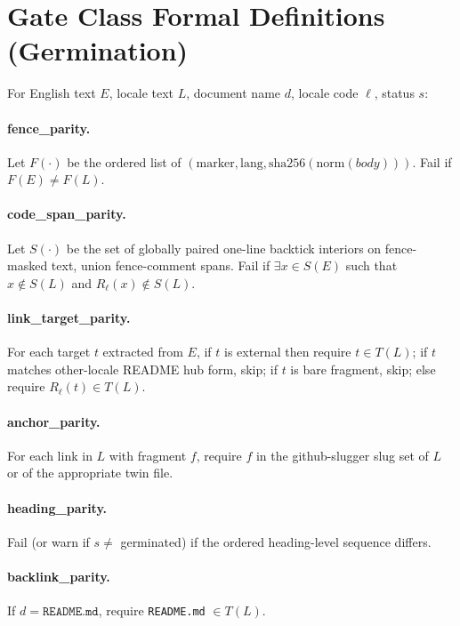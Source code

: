 \documentclass[11pt]{article}
\theoremstyle{definition}
\theoremstyle{plain}
\theoremstyle{remark}
\begin{document}
\section{Gate Class Formal Definitions (Germination)}
\label{app:gate}

For English text $E$, locale text $L$, document name $d$, locale code $\ell$,
status $s$:

\paragraph{fence\_parity.}
Let $F(\cdot)$ be the ordered list of
$(\mathrm{marker}, \mathrm{lang}, \mathrm{sha256}(\mathrm{norm}(body)))$.
Fail if $F(E) \neq F(L)$.

\paragraph{code\_span\_parity.}
Let $S(\cdot)$ be the set of globally paired one-line backtick interiors on
fence-masked text, union fence-comment spans. Fail if $\exists x \in S(E)$
such that $x \notin S(L)$ and $R_\ell(x) \notin S(L)$.

\paragraph{link\_target\_parity.}
For each target $t$ extracted from $E$, if $t$ is external then require $t
\in T(L)$; if $t$ matches other-locale README hub form, skip; if $t$ is bare
fragment, skip; else require $R_\ell(t) \in T(L)$.

\paragraph{anchor\_parity.}
For each link in $L$ with fragment $f$, require $f$ in the github-slugger
slug set of $L$ or of the appropriate twin file.

\paragraph{heading\_parity.}
Fail (or warn if $s\neq$ germinated) if the ordered heading-level sequence
differs.

\paragraph{backlink\_parity.}
If $d=\texttt{README.md}$, require \texttt{README.md} $\in T(L)$.
\end{document}
